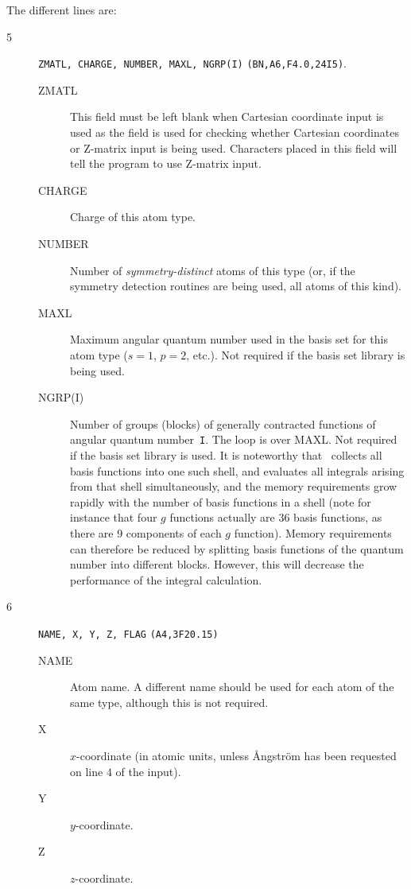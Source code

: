 The different lines are:
\begin{description}
\item[5] \verb|ZMATL, CHARGE, NUMBER, MAXL, NGRP(I)|
{\tt (BN,A6,F4.0,24I5)}.
\begin{description}
\item[ZMATL] This field must be left blank when Cartesian
coordinate input is used as the field
is used for checking whether
Cartesian coordinates or Z-matrix input is being
used. Characters
placed in this field will tell the program to use Z-matrix input.
\item[CHARGE] Charge of this atom type.
\item[NUMBER] Number of {\em symmetry-distinct} atoms of
this type (or, if the symmetry detection routines are being used, all
atoms of this kind).
\item[MAXL] Maximum angular quantum number used in the
basis set for this atom type ($s=1$, $p=2$, etc.). Not required if the
basis set library is being used.
\item[NGRP(I)] Number of groups (blocks) of generally contracted
functions of angular quantum number~{\tt I}. The loop is over MAXL. Not
required if the basis set library is used. It is noteworthy that
\siraba\ collects all basis functions into one such shell, and
evaluates all integrals arising from that shell simultaneously, and
the memory requirements grow rapidly with the number of basis
functions in a shell (note for instance that four $g$ functions
actually are 36
basis functions, as there are 9 components of each $g$
function). Memory requirements can therefore be reduced
by splitting
basis functions of the quantum number into different blocks. However,
this will decrease the performance of the integral calculation.
\end{description}
\item[6] \verb|NAME, X, Y, Z, FLAG| {\tt (A4,3F20.15)}
\begin{description}
\item[NAME] Atom name.  A different name should be used for
each atom of the same type, although this is not required.
\item[X] $x$-coordinate (in atomic units, unless \AA ngstr\"{o}m
has been requested on line $4$ of the input).
\item[Y] $y$-coordinate.
\item[Z] $z$-coordinate.

\end{description}
\end{description}
